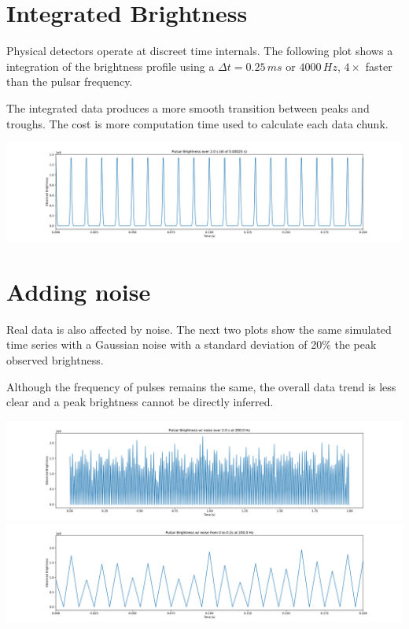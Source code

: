 \documentclass{article}
\begin{document}
\section{Integrated Brightness}

Physical detectors operate at discreet time internals. The following plot shows
a integration of the brightness profile using a $\Delta t = 0.25 \, ms$ or
$4000\, Hz$, $4\times$ faster than the pulsar frequency.

The integrated data produces a more smooth transition between peaks and troughs.
The cost is more computation time used to calculate each data chunk.

\includegraphics[width=\textwidth]{integrated_brightness.pdf}

\section{Adding noise}

Real data is also affected by noise. The next two plots show the same simulated
time series with a Gaussian noise with a standard deviation of 20\% the peak
observed brightness.

Although the frequency of pulses remains the same, the overall data trend is
less clear and a peak brightness cannot be directly inferred.

\includegraphics[width=\textwidth]{noise_brightness_200.0_hz.pdf}
\includegraphics[width=\textwidth]{noise_brightness_200.0_hz_range.pdf}
\end{document}
